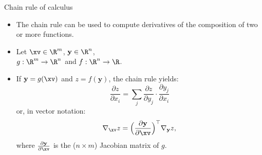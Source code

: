 \documentclass[11pt,compress,t,notes=noshow, xcolor=table]{beamer}
\begin{document}


\begin{vbframe}{Chain rule of calculus}
  \begin{itemize}
    \item The chain rule can be used to compute derivatives of the composition of two or more functions.
    \item Let $\xv \in \R^m$, $\mathbf{y} \in \R^n$, \\
          $g: \R^m \to \R^n$ and $f: \R^n \to \R$. \\
    \item If $\mathbf{y} = g(\xv)$ and $z = f(\mathbf{y})$, the chain rule yields: $$\frac{\partial z}{\partial x_i} = \sum_j \frac{\partial z}{\partial y_j} \cdot \frac{\partial y_j}{\partial x_i}$$
          or, in vector notation: $$\nabla_{\xv} z = \Big(\frac{\partial \mathbf{y}}{\partial \xv}\Big)^\top \nabla_{\mathbf{y}} z,$$
          where $\frac{\partial \mathbf{y}}{\partial \xv}$ is the ($n \times m$) Jacobian matrix of $g$.
  \end{itemize}
\end{vbframe}  
\end{document}
